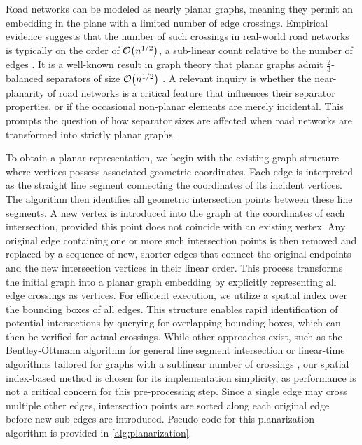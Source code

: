 Road networks can be modeled as nearly planar graphs, meaning they permit an embedding in the plane with a limited number of edge crossings.
Empirical evidence suggests that the number of such crossings in real-world road networks is typically on the order of \(\mathcal{O}\!\left(n^{1/2}\right)\), a sub-linear count relative to the number of edges \cite{eppstein_studying_2008}.
It is a well-known result in graph theory that planar graphs admit \(\frac{2}{3}\)-balanced separators of size \(\mathcal{O}\!\left(n^{1/2}\right)\) \cite{lipton_separator_1979}.
A relevant inquiry is whether the near-planarity of road networks is a critical feature that influences their separator properties, or if the occasional non-planar elements are merely incidental.
This prompts the question of how separator sizes are affected when road networks are transformed into strictly planar graphs.

To obtain a planar representation, we begin with the existing graph structure where vertices possess associated geometric coordinates.
Each edge is interpreted as the straight line segment connecting the coordinates of its incident vertices.
The algorithm then identifies all geometric intersection points between these line segments.
A new vertex is introduced into the graph at the coordinates of each intersection, provided this point does not coincide with an existing vertex.
Any original edge containing one or more such intersection points is then removed and replaced by a sequence of new, shorter edges that connect the original endpoints and the new intersection vertices in their linear order.
This process transforms the initial graph into a planar graph embedding by explicitly representing all edge crossings as vertices.
For efficient execution, we utilize a spatial index over the bounding boxes of all edges.
This structure enables rapid identification of potential intersections by querying for overlapping bounding boxes, which can then be verified for actual crossings.
While other approaches exist, such as the Bentley-Ottmann algorithm for general line segment intersection \cite{bentley_algorithms_1979} or linear-time algorithms tailored for graphs with a sublinear number of crossings \cite{eppstein_linear-time_2010}, our spatial index-based method is chosen for its implementation simplicity, as performance is not a critical concern for this pre-processing step.
Since a single edge may cross multiple other edges, intersection points are sorted along each original edge before new sub-edges are introduced.
Pseudo-code for this planarization algorithm is provided in \cref{alg:planarization}.

